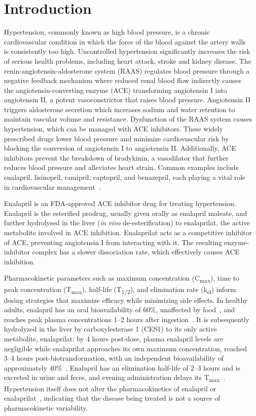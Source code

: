 \section{Introduction}\label{sec:introduction}\justifying{}
Hypertension, commonly known as high blood pressure, is a chronic cardiovascular condition in which the force of the blood against the artery walls is consistently too high. Uncontrolled hypertension significantly increases the risk of serious health problems, including heart attack, stroke and kidney disease. The renin-angiotensin-aldosterone system (RAAS) regulates blood pressure through a negative feedback mechanism where reduced renal blood flow indirectly causes the angiotensin-converting enzyme (ACE) transforming angiotensin I into angiotensin II, a potent vasoconstrictor that raises blood pressure. Angiotensin II triggers aldosterone secretion which increases sodium and water retention to maintain vascular volume and resistance. Dysfunction of the RAAS system causes hypertension, which can be managed with ACE inhibitors. These widely prescribed drugs lower blood pressure and minimize cardiovascular risk by blocking the conversion of angiotensin I to angiotensin II. Additionally, ACE inhibitors prevent the breakdown of bradykinin, a vasodilator that further reduces blood pressure and alleviates heart strain. Common examples include enalapril, lisinopril, ramipril, captopril, and benazepril, each playing a vital role in cardiovascular management~\cite{Vertes1992}.

Enalapril is an FDA-approved ACE inhibitor drug for treating hypertension. Enalapril is the esterified prodrug, usually given orally as enalapril maleate, and further hydrolysed in the liver (\textit{in vivo} de-esterification) to enalaprilat, the active metabolite involved in ACE inhibition. Enalaprilat acts as a competitive inhibitor of ACE, preventing angiotensin I from interacting with it. The resulting enzyme-inhibitor complex has a slower dissociation rate, which effectively causes ACE inhibition. 

Pharmacokinetic parameters such as maximum concentration (C\textsubscript{max}), time to peak concentration (T\textsubscript{max}), half-life (T\textsubscript{1/2}), and elimination rate (k\textsubscript{el}) inform dosing strategies that maximize efficacy while minimizing side effects. In healthy adults, enalapril has an oral bioavailability of 60\%, unaffected by food~\cite{Swanson1984}, and reaches peak plasma concentrations 1--2 hours after ingestion~\cite{Dickstein1987, MacFadyen1993, Ulm1983, VanHecken2020}. It is subsequently hydrolyzed in the liver by carboxylesterase 1 (CES1) to its only active metabolite, enalaprilat: by 4 hours post-dose, plasma enalapril levels are negligible while enalaprilat approaches its own maximum concentration, reached 3--4 hours post-biotransformation, with an independent bioavailability of approximately 40\%~\cite{Davies1984, Till1984}. Enalapril has an elimination half-life of 2--3 hours and is excreted in urine and feces, and evening administration delays its T\textsubscript{max}~\cite{Weisser1991}. Hypertension itself does not alter the pharmacokinetics of enalapril or enalaprilat~\cite{Todd1992b}, indicating that the disease being treated is not a source of pharmacokinetic variability.

